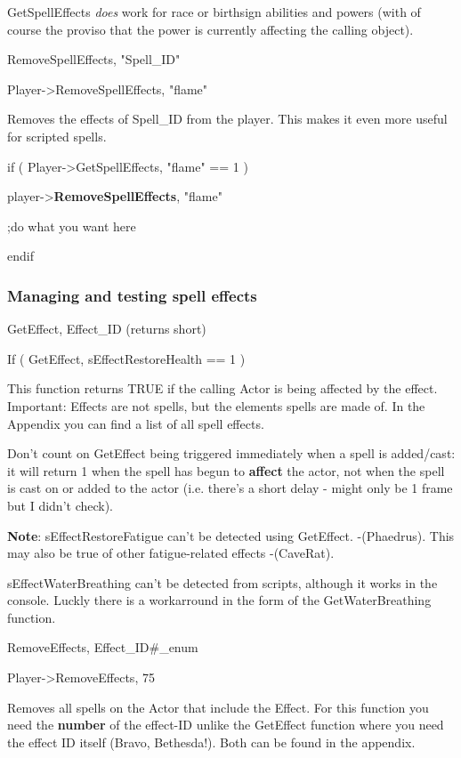 GetSpellEffects \emph{does} work for race or birthsign abilities and
powers (with of course the proviso that the power is currently affecting
the calling object).

RemoveSpellEffects, "Spell\_ID"

Player-\textgreater RemoveSpellEffects, "flame"

Removes the effects of Spell\_ID from the player. This makes it even
more useful for scripted spells.

if ( Player-\textgreater GetSpellEffects, "flame" == 1 )

player-\textgreater{}\textbf{RemoveSpellEffects}, "flame"

;do what you want here

endif

\hypertarget{managing-and-testing-spell-effects}{%
\subsubsection{Managing and testing spell
effects}\label{managing-and-testing-spell-effects}}

GetEffect, Effect\_ID (returns short)

If ( GetEffect, sEffectRestoreHealth == 1 )

This function returns TRUE if the calling Actor is being affected by the
effect. Important: Effects are not spells, but the elements spells are
made of. In the Appendix you can find a list of all spell effects.

Don't count on GetEffect being triggered immediately when a spell is
added/cast: it will return 1 when the spell has begun to \textbf{affect}
the actor, not when the spell is cast on or added to the actor (i.e.
there's a short delay - might only be 1 frame but I didn't check).

\textbf{Note}: sEffectRestoreFatigue can't be detected using GetEffect.
-(Phaedrus). This may also be true of other fatigue-related effects
-(CaveRat).

sEffectWaterBreathing can't be detected from scripts, although it works
in the console. Luckly there is a workarround in the form of the
GetWaterBreathing function.

RemoveEffects, Effect\_ID\#\_enum

Player-\textgreater RemoveEffects, 75

Removes all spells on the Actor that include the Effect. For this
function you need the \textbf{number} of the effect-ID unlike the
GetEffect function where you need the effect ID itself (Bravo,
Bethesda!). Both can be found in the appendix.

